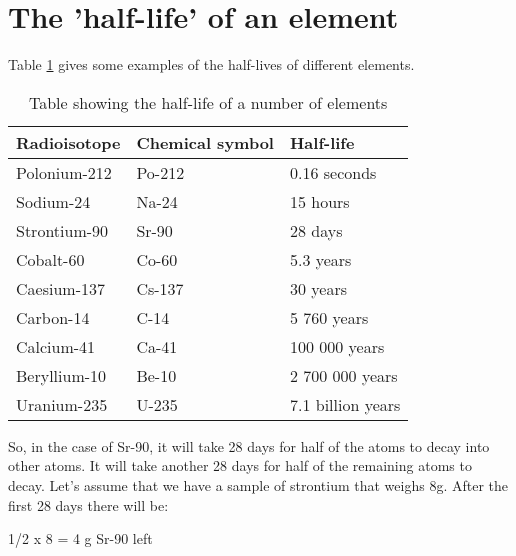 



\section{The 'half-life' of an element}
\label{sec:an:halflife}


Table \ref{tab:an:r} gives some examples of the half-lives of different elements.\\ 

\begin{table}[!h]
\begin{center}
\caption{Table showing the half-life of a number of elements}

\begin{tabular}{|l|l|l|}\hline
\textbf{Radioisotope} & \textbf{Chemical symbol} & \textbf{Half-life}\\\hline\hline
Polonium-212 & Po-212 & 0.16 seconds\\\hline
Sodium-24 & Na-24 & 15 hours\\\hline
Strontium-90 & Sr-90 & 28 days\\\hline
Cobalt-60 & Co-60 & 5.3 years\\\hline
Caesium-137 & Cs-137 & 30 years\\\hline
Carbon-14 & C-14 & 5 760 years\\\hline
Calcium-41 & Ca-41 & 100 000 years\\\hline
Beryllium-10 & Be-10 & 2 700 000 years\\\hline
Uranium-235 & U-235 & 7.1 billion years\\\hline\hline 
\end{tabular}
\label{tab:an:r}

\end{center}
\end{table}

So, in the case of Sr-90, it will take 28 days for half of the atoms to decay into other atoms. It will take another 28 days for half of the remaining atoms to decay. Let's assume that we have a sample of strontium that weighs 8g. After the first 28 days there will be:

\begin{center}
1/2 x 8 = 4 g Sr-90 left
\end{center}

